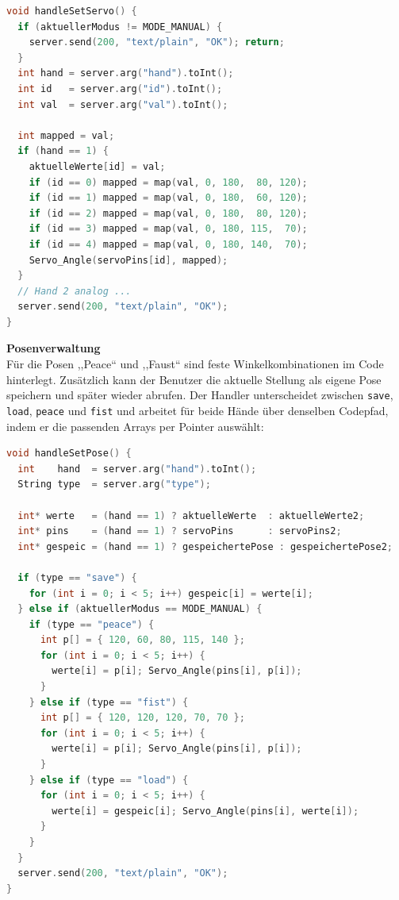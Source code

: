 \documentclass[12pt,a4paper]{article}
\begin{document}
\begin{lstlisting}[language=C++, caption={Handler: Schieberegler-Wert auf Servo-Winkel mappen}]
void handleSetServo() {
  if (aktuellerModus != MODE_MANUAL) {
    server.send(200, "text/plain", "OK"); return;
  }
  int hand = server.arg("hand").toInt();
  int id   = server.arg("id").toInt();
  int val  = server.arg("val").toInt();

  int mapped = val;
  if (hand == 1) {
    aktuelleWerte[id] = val;
    if (id == 0) mapped = map(val, 0, 180,  80, 120);
    if (id == 1) mapped = map(val, 0, 180,  60, 120);
    if (id == 2) mapped = map(val, 0, 180,  80, 120);
    if (id == 3) mapped = map(val, 0, 180, 115,  70);
    if (id == 4) mapped = map(val, 0, 180, 140,  70);
    Servo_Angle(servoPins[id], mapped);
  }
  // Hand 2 analog ...
  server.send(200, "text/plain", "OK");
}
\end{lstlisting}

\vspace{0.5em}
\textbf{Posenverwaltung} \\
Für die Posen ,,Peace`` und ,,Faust`` sind feste Winkelkombinationen im Code hinterlegt. Zusätzlich kann der Benutzer die aktuelle Stellung als eigene Pose speichern und später wieder abrufen. Der Handler unterscheidet zwischen \texttt{save}, \texttt{load}, \texttt{peace} und \texttt{fist} und arbeitet für beide Hände über denselben Codepfad, indem er die passenden Arrays per Pointer auswählt:

\begin{lstlisting}[language=C++, caption={Handler: Posen speichern und abrufen}]
void handleSetPose() {
  int    hand  = server.arg("hand").toInt();
  String type  = server.arg("type");

  int* werte   = (hand == 1) ? aktuelleWerte  : aktuelleWerte2;
  int* pins    = (hand == 1) ? servoPins      : servoPins2;
  int* gespeic = (hand == 1) ? gespeichertePose : gespeichertePose2;

  if (type == "save") {
    for (int i = 0; i < 5; i++) gespeic[i] = werte[i];
  } else if (aktuellerModus == MODE_MANUAL) {
    if (type == "peace") {
      int p[] = { 120, 60, 80, 115, 140 };
      for (int i = 0; i < 5; i++) {
        werte[i] = p[i]; Servo_Angle(pins[i], p[i]);
      }
    } else if (type == "fist") {
      int p[] = { 120, 120, 120, 70, 70 };
      for (int i = 0; i < 5; i++) {
        werte[i] = p[i]; Servo_Angle(pins[i], p[i]);
      }
    } else if (type == "load") {
      for (int i = 0; i < 5; i++) {
        werte[i] = gespeic[i]; Servo_Angle(pins[i], werte[i]);
      }
    }
  }
  server.send(200, "text/plain", "OK");
}
\end{lstlisting}
\end{document}
